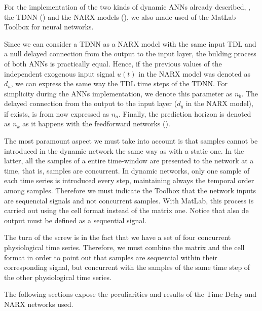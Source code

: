 
\label{sec:application:tdnn}

For the implementation of the two kinds of dynamic ANNs already
described,
\ie, the TDNN () and the NARX models (), 
we also made used of the MatLab Toolbox for neural networks. 

Since we can consider a TDNN as a NARX model with the same input TDL
and a null delayed connection from the output to the input layer, the
bulding process of both ANNs is practically equal. Hence, if the
previous values of the independent exogenous input signal $u(t)$ in
the NARX model was denoted as $d_{u}$, we can express the same way the
TDL time steps of the TDNN. For simplicity during the ANNs
implementation, we denote this parameter as $n_{b}$. The delayed
connection from the output to the input layer ($d_{y}$ in the NARX
model), if exists, is from now expressed as $n_{a}$.  Finally, the
prediction horizon is denoted as $n_{k}$ as it happens with the
feedforward networks ().

The most paramount aspect we must take into account is that samples
cannot be introduced in the dynamic network the same way as with a
static one.  In the latter, all the samples of a entire time-window
are presented to the network at a time, that is, samples are
concurrent.  In dynamic networks, only one sample of each time series
is introduced every step, maintaining always the temporal order among
samples. Therefore we must indicate the Toolbox that the network
inputs are sequencial signals and not concurrent samples. With MatLab,
this process is carried out using the cell format instead of the
matrix one. Notice that also de output must be defined as a sequential
signal.

The turn of the screw is in the fact that we have a set of four
concurrent physiological time series. Therefore, we must combine the
matrix and the cell format in order to point out that samples are
sequential within their corresponding signal, but concurrent with the
samples of the same time step of the other physiological time series.

The following sections expose the peculiarities and results of the
Time Delay and NARX networks used.





